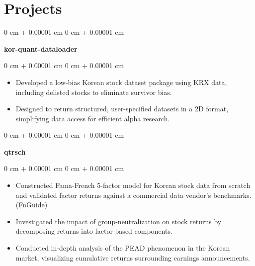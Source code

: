 \documentclass[10pt, letterpaper]{article}
\newenvironment{highlights}{
    \begin{itemize}[
        topsep=0.10 cm,
        parsep=0.10 cm,
        partopsep=0pt,
        itemsep=0pt,
        leftmargin=0 cm + 10pt
    ]
}{
    \end{itemize}
} %
\newenvironment{onecolentry}{
    \begin{adjustwidth}{
        0 cm + 0.00001 cm
    }{
        0 cm + 0.00001 cm
    }
}{
    \end{adjustwidth}
} %
\begin{document}
    
    \section{Projects}



        
        \begin{onecolentry}
            \textbf{kor-quant-dataloader}\end{onecolentry}

        \vspace{0.10 cm}
        \begin{onecolentry}
            \begin{highlights}
                \item Developed a low-bias Korean stock dataset package using KRX data, including delisted stocks to eliminate survivor bias.
                \item Designed to return structured, user-specified datasets in a 2D format, simplifying data access for efficient alpha research.
            \end{highlights}
        \end{onecolentry}


        \vspace{0.2 cm}

        \begin{onecolentry}
            \textbf{qtrsch}\end{onecolentry}

        \vspace{0.10 cm}
        \begin{onecolentry}
            \begin{highlights}
                \item Constructed Fama-French 5-factor model for Korean stock data from scratch and validated factor returns against a commercial data vendor's benchmarks. (FnGuide)
                \item Investigated the impact of group-neutralization on stock returns by decomposing returns into factor-based components.
                \item Conducted in-depth analysis of the PEAD phenomenon in the Korean market, visualizing cumulative returns surrounding earnings announcements.
            \end{highlights}
        \end{onecolentry}


        \vspace{0.2 cm}
\end{document}
